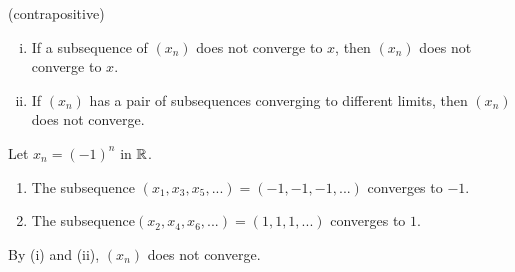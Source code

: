 \begin{corollary} (contrapositive)
    \begin{enumerate}[(i)]
        \item If a subsequence of $(x_n)$ does not converge to $x$, then $(x_n)$ does not converge to $x$.
        \item If $(x_n)$ has a pair of subsequences converging to different limits, then $(x_n)$ does not converge.
    \end{enumerate}
\end{corollary}

\begin{example}
    Let $x_n = (-1)^n$ in $\mathbb{R}$.
    \begin{enumerate}
        \item The subsequence $(x_1, x_3, x_5,...) = (-1, -1, -1,...)$ converges to $-1.$
        \item The subsequence$(x_2, x_4, x_6,...) = (1, 1, 1, ...)$ converges to $1$.
    \end{enumerate}
    By (i) and (ii), $(x_n)$ does not converge.
\end{example}

